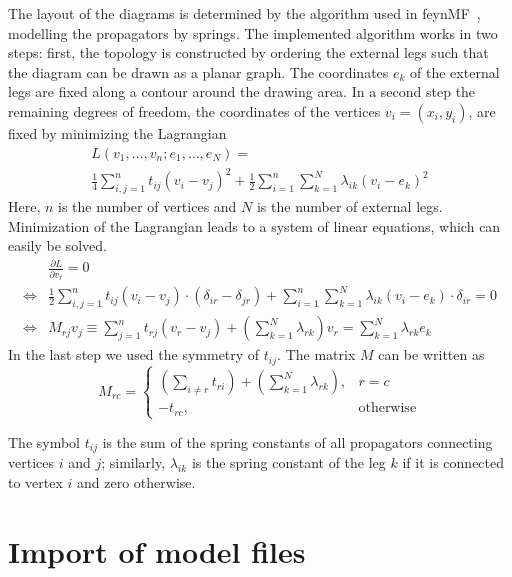 \documentclass[11pt,a4paper]{refrep}
\begin{document}
The layout of the diagrams is determined by the algorithm used in
\textsf{feynMF}~\cite{Ohl:1995kr}, modelling the propagators by springs.
The implemented algorithm works in two steps: first, the topology is
constructed by ordering the external legs such that the diagram can
be drawn as a planar graph. The coordinates $e_k$
of the external legs are
fixed along a contour around the drawing area.
In a second step the remaining degrees of freedom, the coordinates
of the vertices $v_i=(x_i, y_i)$, are fixed by minimizing the Lagrangian
\begin{multline}
L(v_1, \ldots, v_n; e_1, \ldots, e_N) =\\
 \frac14\sum_{i,j=1}^n t_{ij}\left(v_i-v_j\right)^2
+\frac12\sum_{i=1}^n\sum_{k=1}^N\lambda_{ik}\left(v_i-e_k\right)^2
\end{multline}
Here, $n$ is the number of vertices and $N$ is the number of external
legs.
Minimization of the Lagrangian leads to a system of linear equations, which
can easily be solved.
\begin{align*}
&\frac{\partial L}{\partial v_r}=0\\
\Leftrightarrow&
 \frac12\sum_{i,j=1}^n t_{ij}\left(v_i-v_j\right)
     \cdot\left(\delta_{ir}-\delta_{jr}\right)
+\sum_{i=1}^n\sum_{k=1}^N\lambda_{ik}\left(v_i-e_k\right)
     \cdot\delta_{ir}=0\\
\Leftrightarrow&
M_{rj}v_j\equiv
 \sum_{j=1}^n t_{rj}\left(v_r-v_j\right)
+\left(\sum_{k=1}^N\lambda_{rk}\right)v_r
=\sum_{k=1}^N\lambda_{rk}e_k
\end{align*}
In the last step we used the symmetry of $t_{ij}$.
The matrix $M$ can be written as
\begin{equation}
M_{rc}=\left\{\begin{array}{ll}
\left(\sum_{i\neq r}t_{ri}\right)+
\left(\sum_{k=1}^N\lambda_{rk}\right),&
r=c\\
-t_{rc},&\text{otherwise}
\end{array}\right.
\end{equation}

The symbol $t_{ij}$ is the sum of the spring constants of all
propagators connecting vertices $i$ and $j$; similarly, $\lambda_{ik}$
is the spring constant of the leg $k$ if it is connected to vertex $i$
and zero otherwise.

\section{Import of model files}
\label{sec:model}
\end{document}
